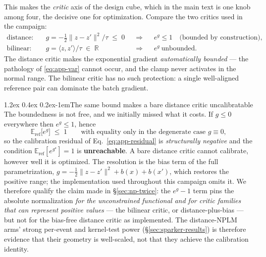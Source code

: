 \documentclass{article}
\makeatletter
\renewcommand\paragraph{\@startsection{paragraph}{4}{\z@}%
  {1.2ex \@plus 0.4ex \@minus 0.2ex}{-1em}{\normalsize\bf}}
\newcommand{\E}{\mathbb{E}}
\newcommand{\R}{\mathbb{R}}
\makeatother
\begin{document}
This makes the \emph{critic} axis of the design cube, which in the main text is
one knob among four, the decisive one for optimization. Compare the two critics
used in the campaign:
\begin{align}
\text{distance:}\quad & g = -\tfrac12\|z-z'\|^2/\tau \;\le\; 0
&&\Longrightarrow&& e^{g}\le 1 \quad\text{(bounded by construction)},\\
\text{bilinear:}\quad & g = \langle z,z'\rangle/\tau \;\in\;\R
&&\Longrightarrow&& e^{g}\ \text{unbounded}.
\end{align}
The distance critic makes the exponential gradient \emph{automatically bounded}
--- the pathology of \eqref{eq:app-var} cannot occur, and the clamp never
activates in the normal range. The bilinear critic has no such protection: a
single well-aligned reference pair can dominate the batch gradient.

\paragraph{The same bound makes a bare distance critic uncalibratable}
The boundedness is not free, and we initially missed what it costs. If
$g\le 0$ everywhere then $e^{g}\le 1$, hence
\begin{equation}
\E_{\mathrm{ref}}\big[e^{g}\big] \;\le\; 1
\qquad\text{with equality only in the degenerate case } g\equiv 0 ,
\end{equation}
so the calibration residual of Eq.~\eqref{eq:app-residual} is
\emph{structurally negative} and the condition $\E_{\mathrm{ref}}[e^{g^\star}]=1$
is \textbf{unreachable}. A bare distance critic cannot calibrate, however well
it is optimized. The resolution is the bias term of the full parametrization,
$g = -\tfrac12\|z-z'\|^2 + b(x) + b(x')$, which restores the positive range;
the implementation used throughout this campaign omits it. We therefore
qualify the claim made in \S\ref{sec:np-twice}: the $e^{g}-1$ term pins the
absolute normalization \emph{for the unconstrained functional and for critic
families that can represent positive values} --- the bilinear critic, or
distance-plus-bias --- but not for the bias-free distance critic as
implemented. The distance-NPLM arms' strong per-event and kernel-test power
(\S\ref{sec:sparker-results}) is therefore evidence that their geometry is
well-scaled, not that they achieve the calibration identity.
\end{document}
